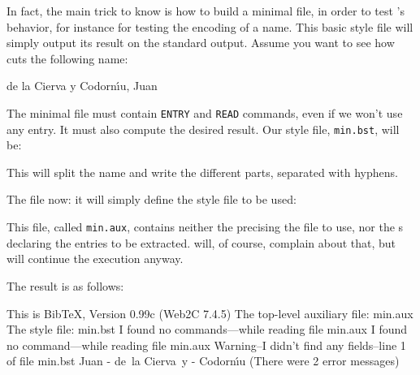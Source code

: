 In fact, the main trick to know is how to build a minimal file, in order to
test \bt{}'s behavior, for instance for testing the encoding of a name. This
basic style file will simply output its result on the standard output. 
Assume you want to see how \bt cuts the following name:
\begin{center}
\begin{minipage}{.8\textwidth}
\begin{verbatimtab}
de la Cierva y Codorn{\'\i}u, Juan
\end{verbatimtab}
\end{minipage}
\end{center}

The minimal  file must contain 
\texttt{ENTRY} and
\texttt{READ}
commands, even if we won't use any entry. It must also compute the desired
result. Our style file, \verb+min.bst+, will be:
\begin{myexv}
\end{myexv} 
\noindent This will split the name and write the different parts, separated
with hyphens.

The  file now: it will simply define the style file to be used:
\begin{myexv}
\begin{verbatimtab}
\end{verbatimtab}
\end{myexv} 

This file, called \verb+min.aux+, contains neither the  
precising the  file to use, nor the s declaring the
entries to be extracted. \bt will, of course, complain about that, but will
continue the execution anyway. 

The result is as follows:
\begin{myexv}
\begin{verbatimtab}
This is BibTeX, Version 0.99c (Web2C 7.4.5)
The top-level auxiliary file: min.aux
The style file: min.bst
I found no \citation commands---while reading file min.aux
I found no \bibdata command---while reading file min.aux
Warning--I didn't find any fields--line 1 of file min.bst
Juan - de~la Cierva~y - Codorn{\'\i}u
(There were 2 error messages)
\end{verbatimtab}
\end{myexv}

